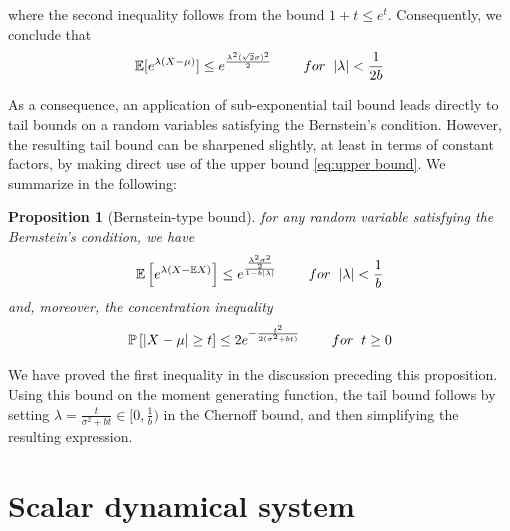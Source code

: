 \documentclass{article}[12pt]
\newtheorem{prop}{Proposition}
\def\E{\mathbb{E}}
\def \E{\mathbb E}
\begin{document}
where the second inequality follows from the bound $1+t\leq e^t$. Consequently, we conclude that 
\begin{equation}
\E[e^{\lambda(X-\mu)}] \leq e^{\frac{\lambda^2(\sqrt{2}\sigma)^2}{2}}  \hspace{8mm}  for \hspace{2mm}  |\lambda| <\frac{1}{2b}
\end{equation}

As a consequence, an application of sub-exponential tail bound leads directly to tail bounds on a random variables satisfying the Bernstein's condition. However, the resulting tail bound can be sharpened slightly, at least in terms of constant factors, by making direct use of the upper bound \ref{eq:upper bound}. We summarize in the following:
 
 \begin{prop} [Bernstein-type bound] for any random variable satisfying the Bernstein's condition, we have
\[ \mgf \leq e^{\frac{\frac{\lambda^2\sigma^2}{2}}{1-b|\lambda|}}
\hspace{8mm}  for \hspace{2mm}  |\lambda| <\frac{1}{b}\]
and, moreover, the concentration inequality
\[ \mathbb{P}\left[|X-\mu|\geq t\right]\leq 2e^{-\frac{t^2}{2(\sigma^2+bt)}}
\hspace{8mm}  for \hspace{2mm} t\geq 0\]

\end{prop}
 
 We have proved the first inequality in the discussion preceding this proposition. Using this bound on the moment generating function, the tail bound follows by setting $\lambda = \frac{t}{\sigma^2+bt}\in [0,\frac{1}{b})$ in the Chernoff bound, and then simplifying the resulting expression. 
 
 
 \section{Scalar dynamical system}
 
\end{document}
